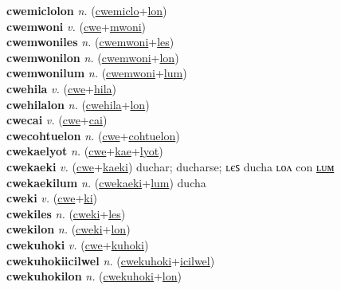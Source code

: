 \textbf{cwemiclolon} \textit{n.} (\hyperref[cwemiclo]{cwemiclo}+\hyperref[lon]{lon})
 \label{cwemiclolon} \\
\textbf{cwemwoni} \textit{v.} (\hyperref[cwe]{cwe}+\hyperref[mwoni]{mwoni})
 \label{cwemwoni} \\
\textbf{cwemwoniles} \textit{n.} (\hyperref[cwemwoni]{cwemwoni}+\hyperref[les]{les})
 \label{cwemwoniles} \\
\textbf{cwemwonilon} \textit{n.} (\hyperref[cwemwoni]{cwemwoni}+\hyperref[lon]{lon})
 \label{cwemwonilon} \\
\textbf{cwemwonilum} \textit{n.} (\hyperref[cwemwoni]{cwemwoni}+\hyperref[lum]{lum})
 \label{cwemwonilum} \\
\textbf{cwehila} \textit{v.} (\hyperref[cwe]{cwe}+\hyperref[hila]{hila})
 \label{cwehila} \\
\textbf{cwehilalon} \textit{n.} (\hyperref[cwehila]{cwehila}+\hyperref[lon]{lon})
 \label{cwehilalon} \\
\textbf{cwecai} \textit{v.} (\hyperref[cwe]{cwe}+\hyperref[cai]{cai})
 \label{cwecai} \\
\textbf{cwecohtuelon} \textit{n.} (\hyperref[cwe]{cwe}+\hyperref[cohtuelon]{cohtuelon})
 \label{cwecohtuelon} \\
\textbf{cwekaelyot} \textit{n.} (\hyperref[cwe]{cwe}+\hyperref[kae]{kae}+\hyperref[lyot]{lyot})
 \label{cwekaelyot} \\
\textbf{cwekaeki} \textit{v.} (\hyperref[cwe]{cwe}+\hyperref[kaeki]{kaeki})
duchar; ducharse; ʟєꜱ ducha ʟᴏᴧ con \hyperref[cwekaekilum]{ʟᴜᴍ} \label{cwekaeki} \\
\textbf{cwekaekilum} \textit{n.} (\hyperref[cwekaeki]{cwekaeki}+\hyperref[lum]{lum})
ducha \label{cwekaekilum} \\
\textbf{cweki} \textit{v.} (\hyperref[cwe]{cwe}+\hyperref[ki]{ki})
 \label{cweki} \\
\textbf{cwekiles} \textit{n.} (\hyperref[cweki]{cweki}+\hyperref[les]{les})
 \label{cwekiles} \\
\textbf{cwekilon} \textit{n.} (\hyperref[cweki]{cweki}+\hyperref[lon]{lon})
 \label{cwekilon} \\
\textbf{cwekuhoki} \textit{v.} (\hyperref[cwe]{cwe}+\hyperref[kuhoki]{kuhoki})
 \label{cwekuhoki} \\
\textbf{cwekuhokiicilwel} \textit{n.} (\hyperref[cwekuhoki]{cwekuhoki}+\hyperref[icilwel]{icilwel})
 \label{cwekuhokiicilwel} \\
\textbf{cwekuhokilon} \textit{n.} (\hyperref[cwekuhoki]{cwekuhoki}+\hyperref[lon]{lon})

